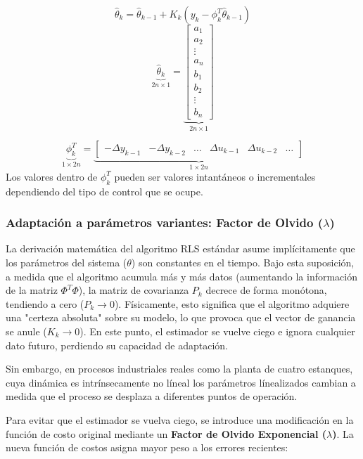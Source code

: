 \begin{equation}
  \hat{\theta}_k = \hat{\theta}_{k-1} + K_k(y_k - \phi_k^T\hat{\theta}_{k-1}) 
  \label{RLS}
\end{equation}
\[
  \underbrace{\hat{\theta}_k}_{2n \times 1} = 
  \underbrace{
  \begin{bmatrix}
    a_1 \\ a_2 \\ \vdots \\ a_n \\ b_1 \\ b_2 \\ \vdots \\ b_n
  \end{bmatrix}
  }_{2n \times 1}
\]

\[
  \underbrace{\phi^T_k}_{1 \times 2n} = 
  \underbrace{
  \begin{bmatrix}
    -\Delta y_{k-1} & -\Delta y_{k-2} & \dots & \Delta u_{k-1} & \Delta u_{k-2} & \dots
  \end{bmatrix}
  }_{1 \times 2n}
\]
Los valores dentro de $\phi^T_k$ pueden ser valores intantáneos o incrementales dependiendo del tipo de control que se ocupe.

\clearpage
\subsubsection{Adaptación a parámetros variantes: Factor de Olvido ($\lambda$)}

La derivación matemática del algoritmo RLS estándar asume implícitamente que los parámetros del sistema ($\theta$) son constantes en el tiempo. Bajo esta suposición, a medida que el algoritmo acumula más y más datos (aumentando la información de la matriz $\Phi^T\Phi$), la matriz de covarianza $P_k$ decrece de forma monótona, tendiendo a cero ($P_k \to 0$). Físicamente, esto significa que el algoritmo adquiere una "certeza absoluta" sobre su modelo, lo que provoca que el vector de ganancia se anule ($K_k \to 0$). En este punto, el estimador se vuelve ciego e ignora cualquier dato futuro, perdiendo su capacidad de adaptación.

Sin embargo, en procesos industriales reales como la planta de cuatro estanques, cuya dinámica es intrínsecamente no líneal  los parámetros línealizados cambian a medida que el proceso se desplaza a diferentes puntos de operación.

Para evitar que el estimador se vuelva ciego, se introduce una modificación en la función de costo original mediante un \textbf{Factor de Olvido Exponencial ($\lambda$)}. La nueva función de costos asigna mayor peso a los errores recientes:

